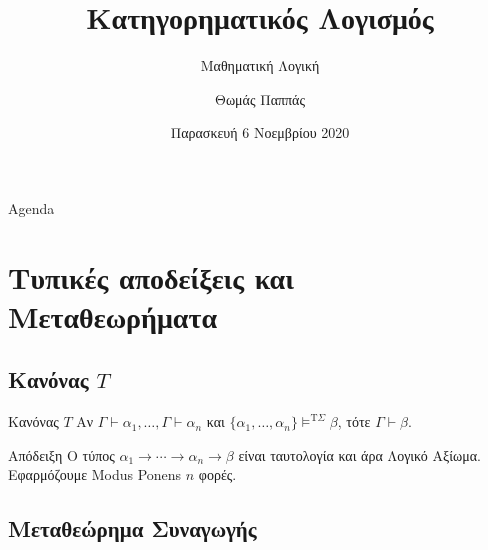 \documentclass{beamer}
\begin{document}
\title{Κατηγορηματικός Λογισμός}
\subtitle{Μαθηματική Λογική}
\author{Θωμάς Παππάς}
\date{Παρασκευή 6 Νοεμβρίου 2020}
\maketitle

\begin{frame}{Agenda}
  \tableofcontents[hideallsubsections]
\end{frame}


\section{Τυπικές αποδείξεις και Μεταθεωρήματα}

\subsection{Κανόνας $T$}

\begin{frame}{Κανόνας $T$}
  Αν $\Gamma \vdash \alpha_1, \ldots, \Gamma \vdash \alpha_n$ και $\{\alpha_1, \ldots, \alpha_n\} \models^{\textrm{T}\Sigma} \beta$, τότε $\Gamma \vdash \beta$.
  \begin{block}{Απόδειξη}
    Ο τύπος $\alpha_1 \rightarrow \cdots \rightarrow \alpha_n \rightarrow \beta$ είναι ταυτολογία και άρα Λογικό Αξίωμα.
    Εφαρμόζουμε Modus Ponens $n$ φορές.
  \end{block}
\end{frame}

\subsection{Μεταθεώρημα Συναγωγής}
\end{document}
